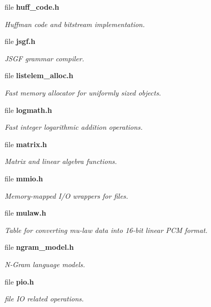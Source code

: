 \begin{DoxyCompactItemize}
file \textbf{ huff\+\_\+code.\+h}
\begin{DoxyCompactList}\small\item\em Huffman code and bitstream implementation. \end{DoxyCompactList}\item 
file \textbf{ jsgf.\+h}
\begin{DoxyCompactList}\small\item\em J\+S\+GF grammar compiler. \end{DoxyCompactList}\item 
file \textbf{ listelem\+\_\+alloc.\+h}
\begin{DoxyCompactList}\small\item\em Fast memory allocator for uniformly sized objects. \end{DoxyCompactList}\item 
file \textbf{ logmath.\+h}
\begin{DoxyCompactList}\small\item\em Fast integer logarithmic addition operations. \end{DoxyCompactList}\item 
file \textbf{ matrix.\+h}
\begin{DoxyCompactList}\small\item\em Matrix and linear algebra functions. \end{DoxyCompactList}\item 
file \textbf{ mmio.\+h}
\begin{DoxyCompactList}\small\item\em Memory-\/mapped I/O wrappers for files. \end{DoxyCompactList}\item 
file \textbf{ mulaw.\+h}
\begin{DoxyCompactList}\small\item\em Table for converting mu-\/law data into 16-\/bit linear P\+CM format. \end{DoxyCompactList}\item 
file \textbf{ ngram\+\_\+model.\+h}
\begin{DoxyCompactList}\small\item\em N-\/\+Gram language models. \end{DoxyCompactList}\item 
file \textbf{ pio.\+h}
\begin{DoxyCompactList}\small\item\em file IO related operations. \end{DoxyCompactList}\item 

\end{DoxyCompactItemize}

